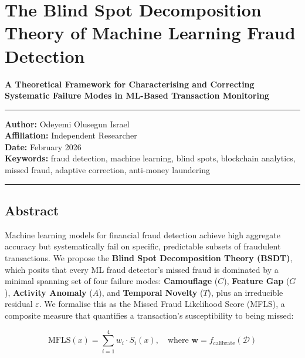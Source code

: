 \documentclass[
  11pt,
]{article}
\author{}
\date{}
\begin{document}
\section{The Blind Spot Decomposition Theory of Machine Learning Fraud
Detection}\label{the-blind-spot-decomposition-theory-of-machine-learning-fraud-detection}

\textbf{A Theoretical Framework for Characterising and Correcting
Systematic Failure Modes in ML-Based Transaction Monitoring}

\begin{center}\rule{0.5\linewidth}{0.5pt}\end{center}

\textbf{Author:} Odeyemi Olusegun Israel\\
\textbf{Affiliation:} Independent Researcher\\
\textbf{Date:} February 2026\\
\textbf{Keywords:} fraud detection, machine learning, blind spots,
blockchain analytics, missed fraud, adaptive correction, anti-money
laundering

\begin{center}\rule{0.5\linewidth}{0.5pt}\end{center}

\subsection{Abstract}\label{abstract}

Machine learning models for financial fraud detection achieve high
aggregate accuracy but systematically fail on specific, predictable
subsets of fraudulent transactions. We propose the \textbf{Blind Spot
Decomposition Theory (BSDT)}, which posits that every ML fraud
detector’s missed fraud is dominated by a minimal spanning set of four
failure modes: \textbf{Camouflage} (\(C\)), \textbf{Feature Gap}
(\(G\)), \textbf{Activity Anomaly} (\(A\)), and \textbf{Temporal
Novelty} (\(T\)), plus an irreducible residual \(\varepsilon\). We
formalise this as the Missed Fraud Likelihood Score (MFLS), a composite
measure that quantifies a transaction’s susceptibility to being missed:

\[\text{MFLS}(x) = \sum_{i=1}^{4} w_i \cdot S_i(x), \quad \text{where } \mathbf{w} = f_{\text{calibrate}}(\mathcal{D})\]
\end{document}
